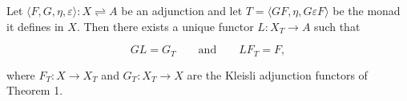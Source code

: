 Let $\langle F, G, \eta, \varepsilon \rangle : X \rightleftharpoons A$ be an adjunction and let $T = \langle GF, \eta, G\varepsilon F \rangle$ be the monad it defines in $X$. Then there exists a unique functor $L : X_T \to A$ such that

$$G L = G_T \qquad\text{and}\qquad L F_T = F,$$

where $F_T : X \to X_T$ and $G_T : X_T \to X$ are the Kleisli adjunction functors of Theorem 1.
